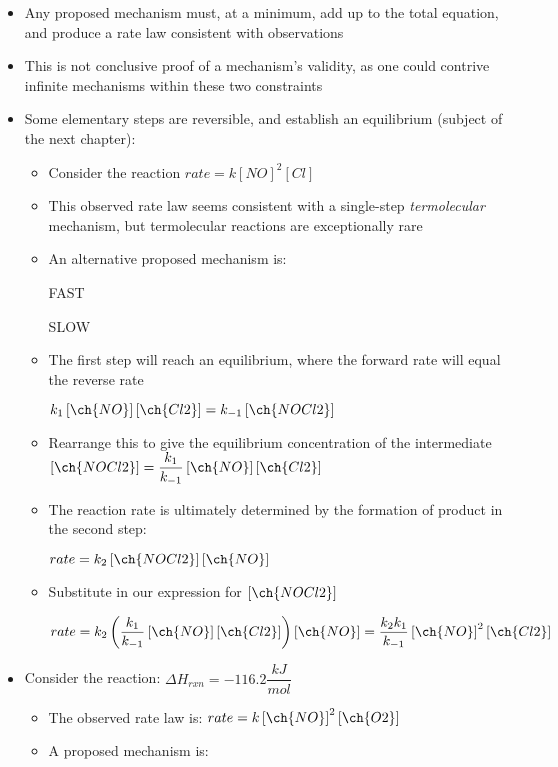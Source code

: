 \documentclass[12pt, openany, letterpaper]{memoir}
\begin{document}
\begin{itemize}
\begin{itemize}
	\end{itemize}
	\item Any proposed mechanism must, at a minimum, add up to the total equation, and produce a rate law consistent with observations
	\item This is not conclusive proof of a mechanism's validity, as one could contrive infinite mechanisms within these two constraints
	\item Some elementary steps are reversible, and establish an equilibrium (subject of the next chapter):
	\begin{itemize}
		\item Consider the reaction  \hspace{1em} $rate=k\left[NO\right]^2\left[Cl\right]$
		\item This observed rate law seems consistent with a single-step \emph{termolecular} mechanism, but termolecular reactions are exceptionally rare
		\item An alternative proposed mechanism is:
		
		 \hspace{1em} FAST
		
		 \hspace{1em} SLOW
		\item The first step will reach an equilibrium, where the forward rate will equal the reverse rate
		
		$k_1\left[\ch{NO}\right]\left[\ch{Cl2}\right] = k_{-1}\left[\ch{NOCl2}\right]$
		\item Rearrange this to give the equilibrium concentration of the intermediate $\left[\ch{NOCl2}\right]=\dfrac{k_1}{k_{-1}}\left[\ch{NO}\right]\left[\ch{Cl2}\right]$
		\item The reaction rate is ultimately determined by the formation of product in the second step:
		
		$rate=k_2\left[\ch{NOCl2}\right]\left[\ch{NO}\right]$
		\item Substitute in our expression for $\left[\ch{NOCl2}\right]$
		
		$rate=k_2\left(\dfrac{k_1}{k_{-1}}\left[\ch{NO}\right]\left[\ch{Cl2}\right]\right)\left[\ch{NO}\right]=\dfrac{k_2k_1}{k_{-1}}\left[\ch{NO}\right]^2\left[\ch{Cl2}\right]$		
	\end{itemize}
	\item Consider the reaction:  \hspace{1em} $\Delta H_{rxn}=-116.2\dfrac{kJ}{mol}$ 
	\begin{itemize}
		\item The observed rate law is: $rate=k\left[\ch{NO}\right]^2\left[\ch{O2}\right]$
		\item A proposed mechanism is:
		

\end{itemize}
\end{itemize}
\end{document}
